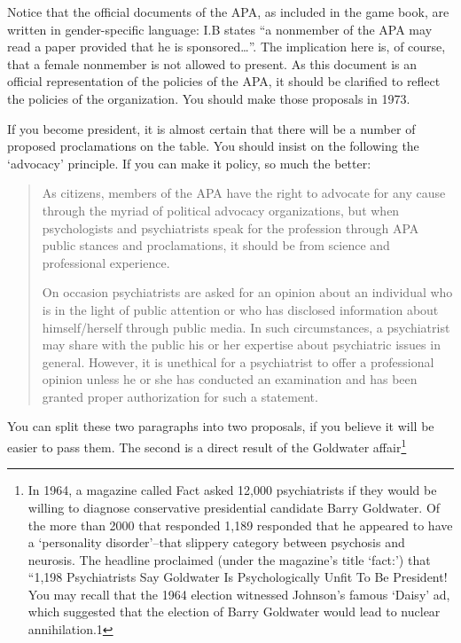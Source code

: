 \begin{refsection}
Notice that the official documents of the APA, as included in the game book, are written in gender-specific language: I.B states “a nonmember of the APA may read a paper provided that he is sponsored{\ldots}”. The implication here is, of course, that a female nonmember is not allowed to present. As this document is an official representation of the policies of the APA, it should be clarified to reflect the policies of the organization. You should make those proposals in 1973.

If you become president, it is almost certain that there will be a number of proposed proclamations on the table. You should insist on the following the `advocacy' principle. If you can make it policy, so much the better:

\begin{quote}

As citizens, members of the APA have the right to advocate for any cause through the myriad of political advocacy organizations, but when psychologists and psychiatrists speak for the profession through APA public stances and proclamations, it should be from science and professional experience.

On occasion psychiatrists are asked for an opinion about an individual who is in the light of public attention or who has disclosed information about himself\slash herself through public media. In such circumstances, a psychiatrist may share with the public his or her expertise about psychiatric issues in general. However, it is unethical for a psychiatrist to offer a professional opinion unless he or she has conducted an examination and has been granted proper authorization for such a statement.
\end{quote}

You can split these two paragraphs into two proposals, if you believe it will be easier to pass them. The second is a direct result of the Goldwater affair\footnote{In 1964, a magazine called Fact asked 12,000 psychiatrists if they would be willing to diagnose conservative presidential candidate Barry Goldwater. Of the more than 2000 that responded 1,189 responded that he appeared to have a `personality disorder'--that slippery category between psychosis and neurosis. The headline proclaimed (under the magazine's title `fact:') that “1,198 Psychiatrists Say Goldwater Is Psychologically Unfit To Be President! You may recall that the 1964 election witnessed Johnson's famous `Daisy' ad, which suggested that the election of Barry Goldwater would lead to nuclear annihilation.⁠1 

}
\end{refsection}
